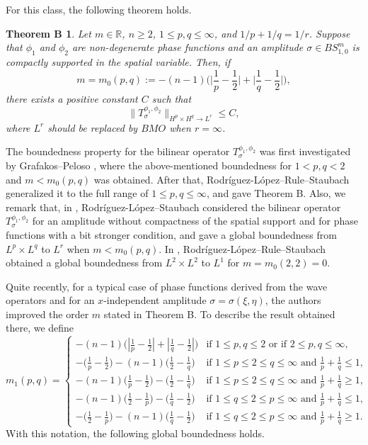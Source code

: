 \documentclass[12pt]{amsart}
\numberwithin{equation}{section}
\theoremstyle{plain}
\newtheorem*{referthmB}{Theorem B}
\theoremstyle{definition}
\newcommand{\R}{\mathbb{R}}
\begin{document}
For this class, the following theorem holds.

\begin{referthmB}
Let $m \in \R$,
$n\ge 2$,  
$1\le p, q\le \infty$, and $1/p+1/q=1/r$.  
Suppose that 
$\phi_1$ and $\phi_2$ are non-degenerate phase functions
and an amplitude 
$\sigma \in BS^{m}_{1,0}$
is compactly supported in the spatial variable.
Then, if 
\[
m = m_{0}(p, q) := -(n-1) 
\Big( \Big|\frac{1}{p} - \frac{1}{2} \Big|
+\Big|\frac{1}{q} - \frac{1}{2} \Big| \Big) ,
\]
there exists a positive constant $C$ such that
\[
\|T_{\sigma}^{\phi_1, \phi_2}\|_{H^p \times H^q \to L^r}
\le C ,
\]
where $L^r$ should be replaced by $BMO$ when $r=\infty$. 
\end{referthmB}


The boundedness property 
for the bilinear operator $T_{\sigma}^{\phi_1, \phi_2}$
was first investigated by Grafakos--Peloso \cite{GP},
where the above-mentioned boundedness 
for $1 < p, q < 2$ and 
$m < m_{0}(p, q)$ was obtained.
After that, 
Rodr\'iguez-L\'opez--Rule--Staubach \cite{RRS-AM} 
generalized it 
to the full range of $1\le p, q\le \infty$,
and gave Theorem B.
Also, we remark that, in \cite{RS},
Rodr\'iguez-L\'opez--Staubach
considered the bilinear operator 
$T_{\sigma}^{\phi_1, \phi_2}$ 
for an amplitude without compactness of the spatial support
and 
for phase functions with a bit stronger condition,
and gave a global boundedness from $L^p \times L^q$ to $L^r$ 
when $m < m_{0}(p, q)$.
In \cite{RRS-TAMS},
Rodr\'iguez-L\'opez--Rule--Staubach
obtained a global boundedness from $L^2 \times L^2$ to $L^1$ 
for $m = m_{0}(2,2) = 0$.


Quite recently,
for a typical case of phase functions
derived from the wave operators
and for an $x$-independent amplitude 
$\sigma = \sigma(\xi, \eta)$,
the authors \cite{KMT}
improved the order $m$ stated in Theorem B.
To describe the result obtained there, 
we define %
\begin{equation*}
m_1 (p, q)
=
\begin{cases}
{-(n-1) \big( 
|\frac{1}{p}- \frac{1}{2}|+|\frac{1}{q}- \frac{1}{2}| \big) }
& 
\text{if $1\le p, q \le 2$ or if $2\le p, q \le \infty$,} 
\\
{-\big( 
\frac{1}{p} - \frac{1}{2} \big) 
- (n-1) \big( \frac{1}{2} - \frac{1}{q} \big) }
& 
\text{if $1\le p\le 2\le q \le \infty$ and $\frac{1}{p}+\frac{1}{q} \le 1$,}
\\
{-(n-1)
\big( \frac{1}{p} - \frac{1}{2} \big) 
- \big( \frac{1}{2} - \frac{1}{q} \big) }
& 
\text{if $1\le p\le 2\le q \le \infty$ and $\frac{1}{p}+\frac{1}{q}\ge 1$,}
\\
{-(n-1)
\big( 
\frac{1}{2} - \frac{1}{p} \big) 
- \big( \frac{1}{q} - \frac{1}{2} \big) }
& 
\text{if $1\le q\le 2\le p \le \infty$ and $\frac{1}{p}+\frac{1}{q} \le 1$,}
\\
{-\big( \frac{1}{2} - \frac{1}{p} \big) 
- (n-1) \big( \frac{1}{q} - \frac{1}{2} \big) }
& 
\text{if $1\le q\le 2\le p \le \infty$ and $\frac{1}{p}+\frac{1}{q}\ge 1$.}
\end{cases}
\end{equation*}
With this notation,
the following global boundedness holds.
\end{document}
